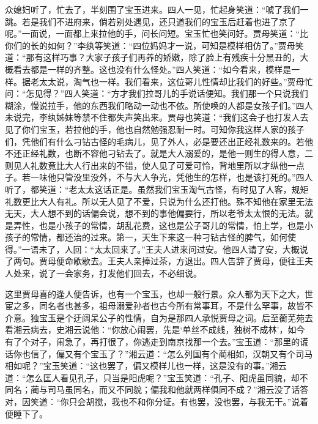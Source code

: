 众媳妇听了，忙去了，半刻围了宝玉进来。四人一见，忙起身笑道：“唬了我们一跳。若是我们不进府来，倘若别处遇见，还只道我们的宝玉后赶着也进了京了呢。”一面说，一面都上来拉他的手，问长问短。宝玉忙也笑问好。贾母笑道：“比你们的长的如何？”李纨等笑道：“四位妈妈才一说，可知是模样相仿了。”贾母笑道：“那有这样巧事？大家子孩子们再养的娇嫩，除了脸上有残疾十分黑丑的，大概看去都是一样的齐整。这也没有什么怪处。”四人笑道：“如今看来，模样是一样。据老太太说，淘气也一样。我们看来，这位哥儿性情却比我们的好些。”贾母忙问：“怎见得？”四人笑道：“方才我们拉哥儿的手说话便知。我们那一个只说我们糊涂，慢说拉手，他的东西我们略动一动也不依。所使唤的人都是女孩子们。”四人未说完，李纨姊妹等禁不住都失声笑出来。贾母也笑道：“我们这会子也打发人去见了你们宝玉，若拉他的手，他也自然勉强忍耐一时。可知你我这样人家的孩子们，凭他们有什么刁钻古怪的毛病儿，见了外人，必是要还出正经礼数来的。若他不还正经礼数，也断不容他刁钻去了。就是大人溺爱的，是他一则生的得人意，二则见人礼数竟比大人行出来的不错，使人见了可爱可怜，背地里所以才纵他一点子。若一味他只管没里没外，不与大人争光，凭他生的怎样，也是该打死的。”四人听了，都笑道：“老太太这话正是。虽然我们宝玉淘气古怪，有时见了人客，规矩礼数更比大人有礼。所以无人见了不爱，只说为什么还打他。殊不知他在家里无法无天，大人想不到的话偏会说，想不到的事他偏要行，所以老爷太太恨的无法。就是弄性，也是小孩子的常情，胡乱花费，这也是公子哥儿的常情，怕上学，也是小孩子的常情，都还治的过来。第一，天生下来这一种刁钻古怪的脾气，如何使得。”一语未了，人回：“太太回来了。”王夫人进来问过安。他四人请了安，大概说了两句。贾母便命歇歇去。王夫人亲捧过茶，方退出。四人告辞了贾母，便往王夫人处来，说了一会家务，打发他们回去，不必细说。

这里贾母喜的逢人便告诉，也有一个宝玉，也却一般行景。众人都为天下之大，世宦之多，同名者也甚多，祖母溺爱孙者也古今所有常事耳，不是什么罕事，故皆不介意。独宝玉是个迂阔呆公子的性情，自为是那四人承悦贾母之词。后至蘅芜苑去看湘云病去，史湘云说他：“你放心闹罢，先是‘单丝不成线，独树不成林’，如今有了个对子，闹急了，再打很了，你逃走到南京找那一个去。”宝玉道：“那里的谎话你也信了，偏又有个宝玉了？”湘云道：“怎么列国有个蔺相如，汉朝又有个司马相如呢？”宝玉笑道：“这也罢了，偏又模样儿也一样，这是没有的事。”湘云道：“怎么匡人看见孔子，只当是阳虎呢？”宝玉笑道：“孔子、阳虎虽同貌，却不同名；蔺与司马虽同名，而又不同貌；偏我和他就两样俱同不成？”湘云没了话答对，因笑道：“你只会胡搅，我也不和你分证。有也罢，没也罢，与我无干。”说着便睡下了。


